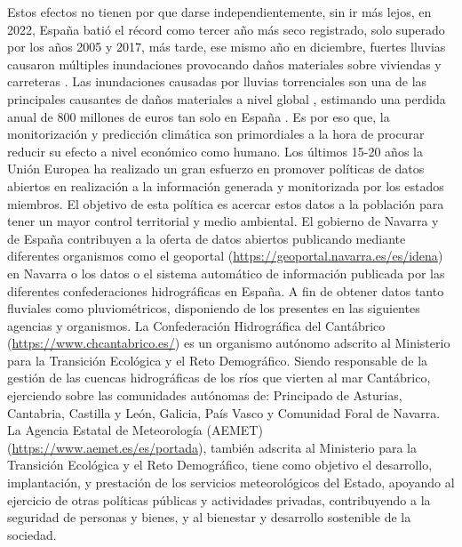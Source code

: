 Estos efectos no tienen por que darse independientemente, sin ir más lejos, en 2022, España batió el récord como tercer año más seco registrado, solo superado por los años 2005 y 2017, más tarde, ese mismo año en diciembre, fuertes lluvias causaron múltiples inundaciones provocando daños materiales sobre viviendas y carreteras \cite{NCEIWebPreci}.\newline
\newline
Las inundaciones causadas por lluvias torrenciales son una de las principales causantes de daños materiales a nivel global \cite{wasko2021incorporating}, estimando una perdida anual de 800 millones de euros tan solo en España \cite{Miteco}. Es por eso que, la monitorización y predicción climática son primordiales a la hora de procurar reducir su efecto a nivel económico como humano.\newline
\newline
Los últimos 15-20 años la Unión Europea ha realizado un gran esfuerzo en promover políticas de datos abiertos en realización a la información generada y monitorizada por los estados miembros. El objetivo de esta política es acercar estos datos a la población para tener un mayor control territorial y medio ambiental. El gobierno de Navarra y de España contribuyen a la oferta de datos abiertos publicando mediante diferentes organismos como el geoportal (\url{https://geoportal.navarra.es/es/idena}) en Navarra o los datos o el sistema automático de información publicada por las diferentes confederaciones hidrográficas en España.\newline
\newline
A fin de obtener datos tanto fluviales como pluviométricos, disponiendo de los presentes en las siguientes agencias y organismos.\newline
\newline
La Confederación Hidrográfica del Cantábrico (\url{https://www.chcantabrico.es/}) es un organismo autónomo adscrito al Ministerio para la Transición Ecológica y el Reto Demográfico. Siendo responsable de la gestión de las cuencas hidrográficas de los ríos que vierten al mar Cantábrico, ejerciendo sobre las comunidades autónomas de: Principado de Asturias, Cantabria, Castilla y León, Galicia, País Vasco y Comunidad Foral de Navarra.\newline
\newline
La Agencia Estatal de Meteorología (AEMET) (\url{https://www.aemet.es/es/portada}), también adscrita al Ministerio para la Transición Ecológica y el Reto Demográfico, tiene como objetivo el desarrollo, implantación, y prestación de los servicios meteorológicos del Estado, apoyando al ejercicio de otras políticas públicas y actividades privadas, contribuyendo a la seguridad de personas y bienes, y al bienestar y desarrollo sostenible de la sociedad.\newline
